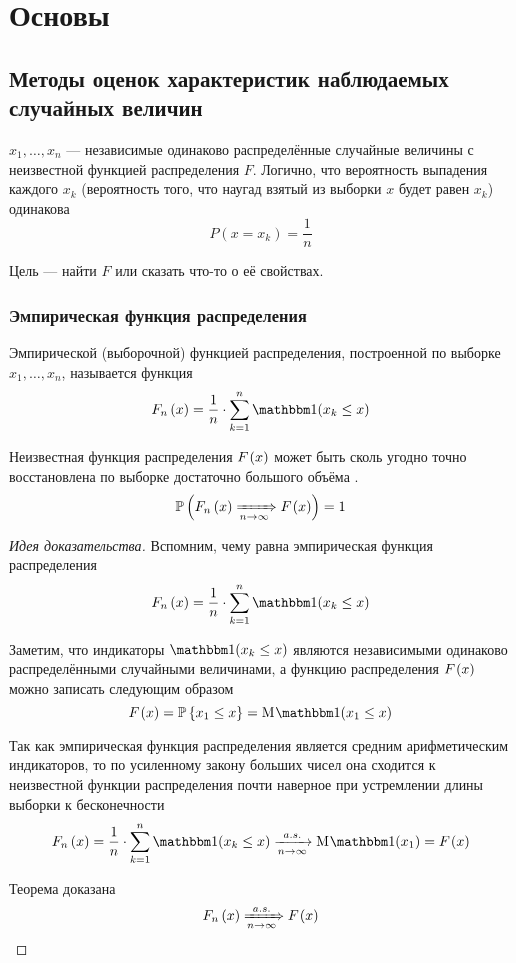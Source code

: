 \chapter{Основы}
\section{Методы оценок характеристик наблюдаемых случайных величин}
$x_1, \dots, x_n$ --- независимые одинаково распределённые случайные величины
с неизвестной функцией распределения $F$.
Логично, что вероятность выпадения каждого $x_k$
(вероятность того, что наугад взятый из выборки $x$ будет равен $x_k$)
одинакова
$$P(x=x_k)=\frac{1}{n}$$

Цель --- найти $F$ или сказать что-то о её свойствах.

\subsection{Эмпирическая функция распределения}
\begin{definition}
    Эмпирической (выборочной) функцией распределения,
    построенной по выборке $x_1, \dots, x_n$, называется функция
    $$\cdfn{x}=\frac{1}{n}\cdot \sum_{k=1}^n
    \indicator{x_k\le x}$$
\end{definition}

\begin{theorem}Неизвестная функция распределения $F_{}\left(x\right)$
    может быть сколь угодно точно
    восстановлена по выборке достаточно большого объёма
    \cite[стр.~25]{BorovkovMS}.
    $$\mathbb{P}\left( F_n\left(x\right)\xRightarrow[n\to\infty]{} F_{}\left(x\right) \right)=1$$
\end{theorem}
\begin{proof}[Идея доказательства]
Вспомним, чему равна эмпирическая функция распределения
$$\cdfn{x}=\frac{1}{n}\cdot \sum_{k=1}^n
\indicator{x_k\le x}$$

Заметим, что индикаторы $\indicator{x_k\le x}$
являются независимыми одинаково распределёнными случайными величинами,
а функцию распределения $F_{}\left(x\right)$ можно записать следующим образом
$$\cdf{x}=\Probability{x_1\le x}=\mean{\indicator{x_1\le x}}$$

Так как эмпирическая функция распределения является
средним арифметическим индикаторов, то по усиленному закону больших чисел
она сходится к неизвестной функции распределения почти наверное
при устремлении длины выборки к бесконечности
$$\cdfn{x}=\frac{1}{n}\cdot\sum_{k=1}^n\indicator{x_k\le x}
\acovergence\mean{\indicator{x_1}}=\cdf{x}$$

Теорема доказана
$$F_n\left(x\right)\xRightarrow[n\to\infty]{a.s.}F_{}\left(x\right)$$
\end{proof}


